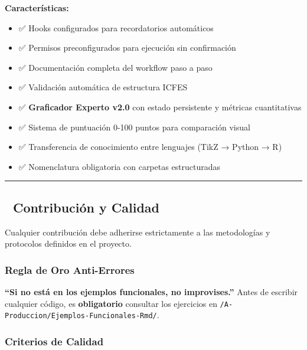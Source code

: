 \documentclass[
]{article}
\providecommand{\tightlist}{%
  \setlength{\itemsep}{0pt}\setlength{\parskip}{0pt}}
\begin{document}
\textbf{Características:}

\begin{itemize}
\tightlist
\item
  ✅ Hooks configurados para recordatorios automáticos
\item
  ✅ Permisos preconfigurados para ejecución sin confirmación
\item
  ✅ Documentación completa del workflow paso a paso
\item
  ✅ Validación automática de estructura ICFES
\item
  ✅ \textbf{Graficador Experto v2.0} con estado persistente y métricas
  cuantitativas
\item
  ✅ Sistema de puntuación 0-100 puntos para comparación visual
\item
  ✅ Transferencia de conocimiento entre lenguajes (TikZ → Python → R)
\item
  ✅ Nomenclatura obligatoria con carpetas estructuradas
\end{itemize}

\begin{center}\rule{0.5\linewidth}{0.5pt}\end{center}

\subsection{\texorpdfstring{🤝 \textbf{Contribución y
Calidad}}{🤝 Contribución y Calidad}}\label{contribuciuxf3n-y-calidad}

Cualquier contribución debe adherirse estrictamente a las metodologías y
protocolos definidos en el proyecto.

\subsubsection{\texorpdfstring{\textbf{Regla de Oro
Anti-Errores}}{Regla de Oro Anti-Errores}}\label{regla-de-oro-anti-errores}

\textbf{``Si no está en los ejemplos funcionales, no improvises.''}
Antes de escribir cualquier código, es \textbf{obligatorio} consultar
los ejercicios en \texttt{/A-Produccion/Ejemplos-Funcionales-Rmd/}.

\subsubsection{\texorpdfstring{\textbf{Criterios de
Calidad}}{Criterios de Calidad}}\label{criterios-de-calidad}
\end{document}
